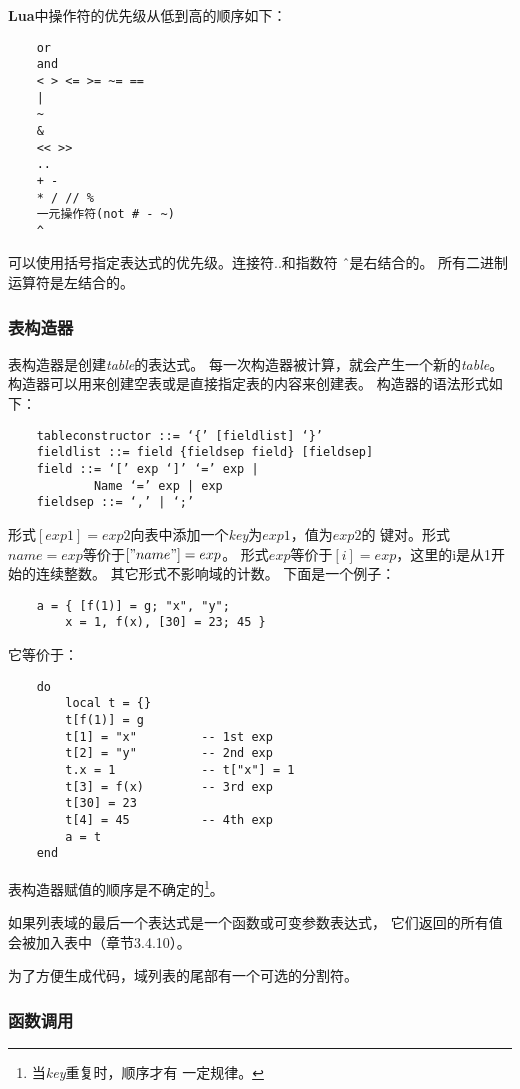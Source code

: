 \documentclass{ctexart}
\begin{document}
\textbf{Lua}中操作符的优先级从低到高的顺序如下：

\lstset{language=C}
\begin{lstlisting}
	or
	and
	< > <= >= ~= ==
	|
	~
	&
	<< >>
	..
	+ -
	* / // %
	一元操作符(not # - ~)
	^
\end{lstlisting}

可以使用括号指定表达式的优先级。连接符..和指数符 \^ \ 是右结合的。
所有二进制运算符是左结合的。

\subsubsection{表构造器}

表构造器是创建\emph{table}的表达式。
每一次构造器被计算，就会产生一个新的\emph{table}。
构造器可以用来创建空表或是直接指定表的内容来创建表。
构造器的语法形式如下：

\lstset{language=C}
\begin{lstlisting}
	tableconstructor ::= ‘{’ [fieldlist] ‘}’
	fieldlist ::= field {fieldsep field} [fieldsep]
	field ::= ‘[’ exp ‘]’ ‘=’ exp | 
			Name ‘=’ exp | exp
	fieldsep ::= ‘,’ | ‘;’
\end{lstlisting}

形式$[exp1]=exp2$向表中添加一个\emph{key}为$exp1$，值为$exp2$的
键对。形式$name=exp$等价于$["name"]=exp$。
形式$exp$等价于$[i]=exp$，这里的i是从1开始的连续整数。
其它形式不影响域的计数。
下面是一个例子：

\lstset{language=C}
\begin{lstlisting}
	a = { [f(1)] = g; "x", "y";
		x = 1, f(x), [30] = 23; 45 }
\end{lstlisting}

它等价于：

\lstset{language=C}
\begin{lstlisting}
	do
		local t = {}
		t[f(1)] = g
		t[1] = "x"         -- 1st exp
		t[2] = "y"         -- 2nd exp
		t.x = 1            -- t["x"] = 1
		t[3] = f(x)        -- 3rd exp
		t[30] = 23
		t[4] = 45          -- 4th exp
		a = t
	end
\end{lstlisting}

表构造器赋值的顺序是不确定的\footnote{当\emph{key}重复时，顺序才有
一定规律。}。

如果列表域的最后一个表达式是一个函数或可变参数表达式，
它们返回的所有值会被加入表中（章节3.4.10）。

为了方便生成代码，域列表的尾部有一个可选的分割符。

\subsubsection{函数调用}
\end{document}

